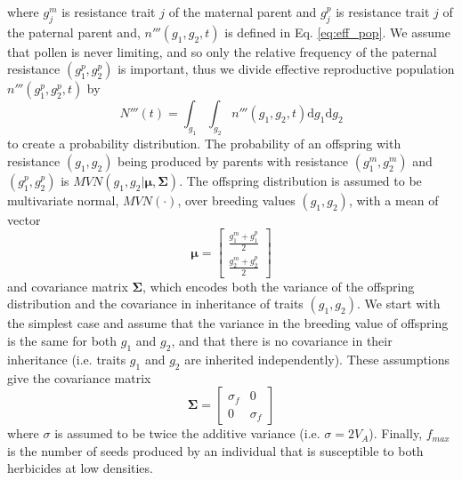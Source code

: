 \documentclass[12pt, a4paper]{article}
\begin{document}
where $g_j^m$ is resistance trait $j$ of the maternal parent and $g_j^p$ is resistance trait $j$ of the paternal parent and, $n'''(g_1, g_2, t)$ is defined in Eq. \ref{eq:eff_pop}. We assume that pollen is never limiting, and so only the relative frequency of the paternal resistance $(g_1^p, g_2^p)$ is important, thus we divide effective reproductive population $n'''(g_1^p, g_2^p, t)$ by
\begin{equation}\label{eq:tot_pop3}
	N'''(t) = \int_{g_1}\int_{g_2} n'''(g_1, g_2, t) \text{d}g_1\text{d}g_2 
\end{equation}  
to create a probability distribution. The probability of an offspring with resistance $(g_1, g_2)$ being produced by parents with resistance $(g_1^m, g_2^m)$ and $(g_1^p, g_2^p)$ is $MVN(g_1, g_2| \mathbf{\mu}, \mathbf{\Sigma})$. The offspring distribution is assumed to be multivariate normal, $MVN(\cdot)$, over breeding values $(g_1, g_2)$, with a mean of vector
\begin{equation*}
	\mathbf{\mu} = \begin{bmatrix}
		\frac{g_1^m + g_1^p}{2}\\
		\frac{g_2^m + g_2^p}{2}
		\end{bmatrix}   
\end{equation*}
and covariance matrix $\mathbf{\Sigma}$, which encodes both the variance of the offspring distribution and the covariance in inheritance of traits $(g_1, g_2)$. We start with the simplest case and assume that the variance in the breeding value of offspring is the same for both $g_1$ and $g_2$, and that there is no covariance in their inheritance (i.e. traits $g_1$ and $g_2$ are inherited independently). These assumptions give the covariance matrix    
\begin{equation}
	\mathbf{\Sigma} = \begin{bmatrix}
		\sigma_f & 0\\
		0 & \sigma_f
	\end{bmatrix}
\end{equation}
where $\sigma$ is assumed to be twice the additive variance (i.e. $\sigma = 2V_A$). Finally, $f_{max}$ is the number of seeds produced by an individual that is susceptible to both herbicides at low densities.   
\end{document}
